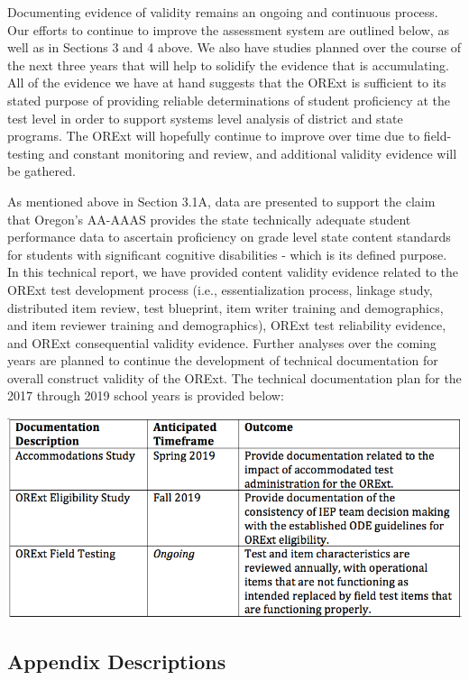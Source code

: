 \documentclass[]{article}
\begin{document}
Documenting evidence of validity remains an ongoing and continuous
process. Our efforts to continue to improve the assessment system are
outlined below, as well as in Sections 3 and 4 above. We also have
studies planned over the course of the next three years that will help
to solidify the evidence that is accumulating. All of the evidence we
have at hand suggests that the ORExt is sufficient to its stated purpose
of providing reliable determinations of student proficiency at the test
level in order to support systems level analysis of district and state
programs. The ORExt will hopefully continue to improve over time due to
field-testing and constant monitoring and review, and additional
validity evidence will be gathered.

As mentioned above in Section 3.1A, data are presented to support the
claim that Oregon's AA-AAAS provides the state technically adequate
student performance data to ascertain proficiency on grade level state
content standards for students with significant cognitive disabilities -
which is its defined purpose. In this technical report, we have provided
content validity evidence related to the ORExt test development process
(i.e., essentialization process, linkage study, distributed item review,
test blueprint, item writer training and demographics, and item reviewer
training and demographics), ORExt test reliability evidence, and ORExt
consequential validity evidence. Further analyses over the coming years
are planned to continue the development of technical documentation for
overall construct validity of the ORExt. The technical documentation
plan for the 2017 through 2019 school years is provided below:

\FloatBarrier
\includegraphics{tifs/techdocplan.png}

\subsection{Appendix Descriptions}\label{appendix-descriptions}
\end{document}
